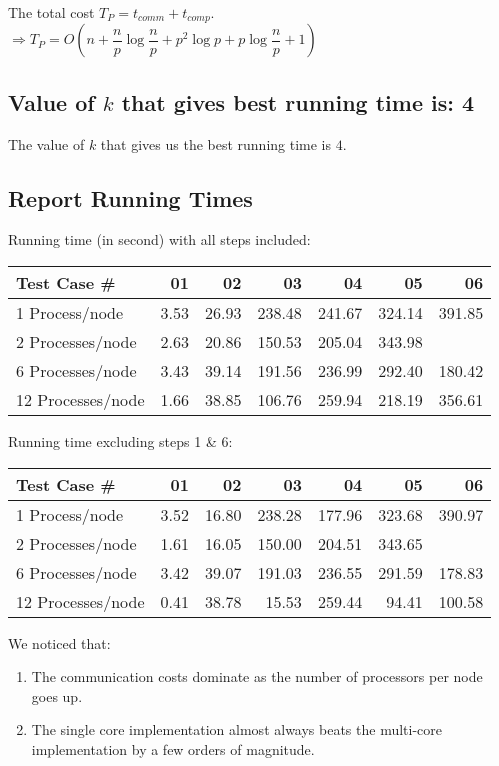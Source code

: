 \documentclass{article}
\begin{document}
The total cost $T_P = t_{comm} + t_{comp}$. 
$\Rightarrow T_P = O(n + \dfrac{n}{p}\log{\dfrac{n}{p}} + p^2\log{p} + p\log{\dfrac{n}{p}} + 1)$

\subsection{Value of $k$ that gives best running time is: 4}

The value of $k$ that gives us the best running time is $4$.

\clearpage

\subsection{Report Running Times}

Running time (in second) with all steps included:

\begin{center}
  \begin{tabular}{| l | r | r | r | r | r | r |}
    \hline
    Test Case \# & 01 & 02 & 03 & 04 & 05 & 06  \\ \hline
    1 Process/node & 3.53 & 26.93 & 238.48 & 241.67 & 324.14 & 391.85 \\ \hline
    2 Processes/node & 2.63 & 20.86 & 150.53 & 205.04 & 343.98 &  \\ \hline
    6 Processes/node & 3.43 & 39.14 & 191.56 & 236.99 & 292.40 & 180.42 \\ \hline
    12 Processes/node & 1.66 & 38.85 & 106.76 & 259.94 & 218.19 & 356.61 \\ \hline
  \end{tabular}
\end{center}


Running time excluding steps 1 \& 6:

\begin{center}
  \begin{tabular}{| l | r | r | r | r | r | r |}
    \hline
    Test Case \# & 01 & 02 & 03 & 04 & 05 & 06  \\ \hline
    1 Process/node & 3.52 & 16.80 & 238.28 & 177.96 & 323.68 & 390.97 \\ \hline
    2 Processes/node & 1.61 & 16.05 & 150.00 & 204.51 & 343.65 &  \\ \hline
    6 Processes/node & 3.42 & 39.07 & 191.03 & 236.55 & 291.59 & 178.83 \\ \hline
    12 Processes/node & 0.41 & 38.78 & 15.53 & 259.44 & 94.41 & 100.58 \\ \hline
  \end{tabular}
\end{center}

We noticed that:

\begin{enumerate}

\item The communication costs dominate as the number of processors per
  node goes up.

\item The single core implementation almost always beats the
  multi-core implementation by a few orders of magnitude.

\end{enumerate}
\end{document}
